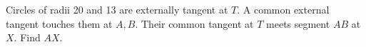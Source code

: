 Circles of radii 20 and 13 are externally tangent at $T$. A common external tangent touches them at $A,B$. Their common tangent at $T$ meets segment $AB$ at $X$. Find $AX$.
